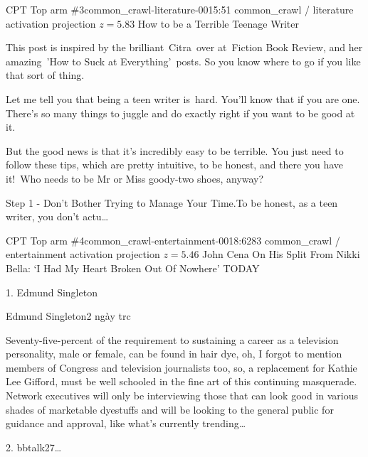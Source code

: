 \begin{docbox}{CPT Top arm \#3}{common\_crawl-literature-0015:51 \textbullet{} common\_crawl / literature \textbullet{} activation projection $z=5.83$}
How to be a Terrible Teenage Writer\par This post is inspired by the brilliant~Citra~over at~Fiction Book Review, and her amazing~'How to Suck at Everything'~posts. So you know where to go if you like that sort of thing.\par Let me tell you that being a teen writer is~hard. You'll know that if you are one. There's so many things to juggle and do exactly right if you want to be good at it.\par But the good news is that it's incredibly easy to be terrible. You just need to follow these tips, which are pretty intuitive, to be honest, and there you have it!~Who needs to be Mr or Miss goody-two shoes, anyway?\par Step 1 - Don't Bother Trying to Manage Your Time.\newline To be honest, as a teen writer, you don't actu\ldots{}
\end{docbox}

\begin{docbox}{CPT Top arm \#4}{common\_crawl-entertainment-0018:6283 \textbullet{} common\_crawl / entertainment \textbullet{} activation projection $z=5.46$}
John Cena On His Split From Nikki Bella: ‘I Had My Heart Broken Out Of Nowhere’ \textbar{} TODAY\par   1. Edmund Singleton\par     Edmund Singleton2 ngày tr\nonlatin{}c\par     Seventy-five-percent of the requirement to sustaining a career as a television personality, male or female, can be found in hair dye, oh, I forgot to mention members of Congress and television journalists too, so, a replacement for Kathie Lee Gifford, must be well schooled in the fine art of this continuing masquerade. Network executives will only be interviewing those that can look good in various shades of marketable dyestuffs and will be looking to the general public for guidance and approval, like what’s currently trending\ldots{}\par   2. bbtalk27\ldots{}
\end{docbox}

